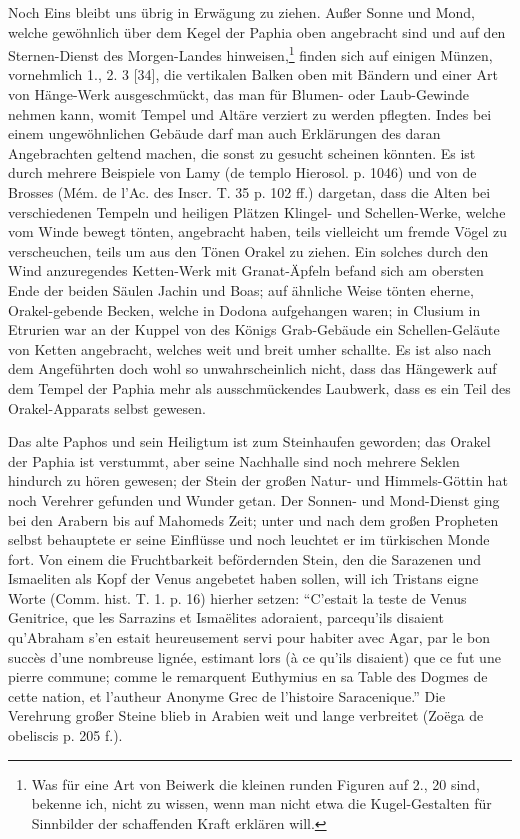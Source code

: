 \documentclass[a4paper, 11pt, oneside, polutonikogreek, german]{article}
\begin{document}
Noch Eins bleibt uns übrig in Erwägung zu ziehen. Außer Sonne und Mond, welche gewöhnlich über dem Kegel der Paphia oben angebracht sind und auf den Sternen-Dienst des Morgen-Landes hinweisen,\footnote{Was für eine Art von Beiwerk die kleinen runden Figuren auf 2., 20 sind, bekenne ich, nicht zu wissen, wenn man nicht etwa die Kugel-Gestalten für Sinnbilder der schaffenden Kraft erklären will.} finden sich auf einigen Münzen, vornehmlich 1., 2. 3 [34], die vertikalen Balken oben mit Bändern und einer Art von Hänge-Werk ausgeschmückt, das man für Blumen- oder Laub-Gewinde nehmen kann, womit Tempel und Altäre verziert zu werden pflegten. Indes bei einem ungewöhnlichen Gebäude darf man auch Erklärungen des daran Angebrachten geltend machen, die sonst zu gesucht scheinen könnten. Es ist durch mehrere Beispiele von Lamy (de templo Hierosol. p. 1046) und von de Brosses (Mém. de l'Ac. des Inscr. T. 35 p. 102 ff.) dargetan, dass die Alten bei verschiedenen Tempeln und heiligen Plätzen Klingel- und Schellen-Werke, welche vom Winde bewegt tönten, angebracht haben, teils vielleicht um fremde Vögel zu verscheuchen, teils um aus den Tönen Orakel zu ziehen. Ein solches durch den Wind anzuregendes Ketten-Werk mit Granat-Äpfeln befand sich am obersten Ende der beiden Säulen Jachin und Boas; auf ähnliche Weise tönten eherne, Orakel-gebende Becken, welche in Dodona aufgehangen waren; in Clusium in Etrurien war an der Kuppel von des Königs Grab-Gebäude ein Schellen-Geläute von Ketten angebracht, welches weit und breit umher schallte. Es ist also nach dem Angeführten doch wohl so unwahrscheinlich nicht, dass das Hängewerk auf dem Tempel der Paphia mehr als ausschmückendes Laubwerk, dass es ein Teil des Orakel-Apparats selbst gewesen.

Das alte Paphos und sein Heiligtum ist zum Steinhaufen geworden; das Orakel der Paphia ist verstummt, aber seine Nachhalle sind noch mehrere Seklen hindurch zu hören gewesen; der Stein der großen Natur- und Himmels-Göttin hat noch Verehrer gefunden und Wunder getan. Der Sonnen- und Mond-Dienst ging bei den Arabern bis auf Mahomeds Zeit; unter und nach dem großen Propheten selbst behauptete er seine Einflüsse und noch leuchtet er im türkischen Monde fort. Von einem die Fruchtbarkeit befördernden Stein, den die Sarazenen und Ismaeliten als Kopf der Venus angebetet haben sollen, will ich Tristans eigne Worte (Comm. hist. T. 1. p. 16) hierher setzen: "`C'estait la teste de Venus Genitrice, que les Sarrazins et Ismaëlites adoraient, parcequ'ils disaient qu'Abraham s'en estait heureusement servi pour habiter avec Agar, par le bon succès d'une nombreuse lignée, estimant lors (à ce qu'ils disaient) que ce fut une pierre commune; comme le remarquent Euthymius en sa Table des Dogmes de cette nation, et l'autheur Anonyme Grec de l'histoire Saracenique."' Die Verehrung großer Steine blieb in Arabien weit und lange verbreitet (Zoëga de obeliscis p. 205 f.).
\end{document}

